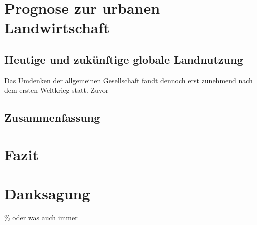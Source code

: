 \documentclass{scrartcl}
\begin{document}
\section{Prognose zur urbanen Landwirtschaft}
\subsection{Heutige und zukünftige globale Landnutzung}
Das Umdenken der allgemeinen Gesellschaft fandt dennoch erst zunehmend nach dem ersten Weltkrieg statt. Zuvor 
\subsection{Zusammenfassung}
\section{Fazit}

\section{Danksagung}

\newpage
\listoffigures

\begingroup
\singlespacing
\setlength\bibitemsep{10pt}\% oder was auch immer
\printbibliography
\endgroup
\end{document}
